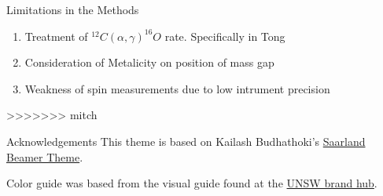 \documentclass[aspectratio=169]{beamer}
\begin{document}
	\begin{frame}{Limitations in the Methods}
		\begin{enumerate}
			\item Treatment of $^{12}C(\alpha , \gamma)^{16}O$ rate. Specifically in Tong
			\item Consideration of Metalicity on position of mass gap
			\item Weakness of spin measurements due to low intrument precision
		\end{enumerate}
	\end{frame}

>>>>>>> mitch
	\begin{frame}{Acknowledgements}
		This theme is based on Kailash Budhathoki's \href{https://github.com/kailashbuki/beamerthemesaarland}{Saarland Beamer Theme}.
		
		Color guide was based from the visual guide found at the \href{https://www.brand.unsw.edu.au/download/}{UNSW brand hub}.
	\end{frame}
\end{document}

